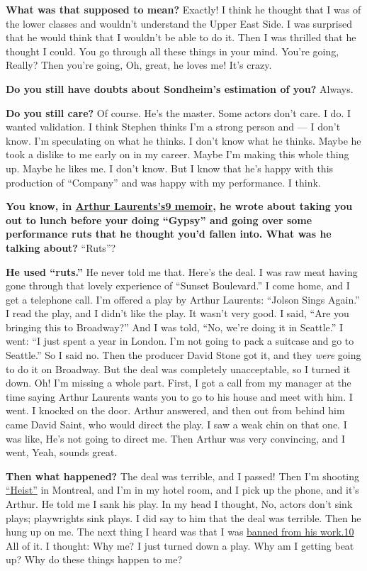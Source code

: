 \textbf{What was that supposed to mean?} Exactly! I think he thought
that I was of the lower classes and wouldn't understand the Upper East
Side. I was surprised that he would think that I wouldn't be able to do
it. Then I was thrilled that he thought I could. You go through all
these things in your mind. You're going, Really? Then you're going, Oh,
great, he loves me! It's crazy.

\textbf{Do you still have doubts about Sondheim's estimation of you?}
Always.

\textbf{Do you still care?} Of course. He's the master. Some actors
don't care. I do. I wanted validation. I think Stephen thinks I'm a
strong person and --- I don't know. I'm speculating on what he thinks. I
don't know what he thinks. Maybe he took a dislike to me early on in my
career. Maybe I'm making this whole thing up. Maybe he likes me. I don't
know. But I know that he's happy with this production of ``Company'' and
was happy with my performance. I think.

\textbf{You know, in
\href{http://nytimes3xbfgragh.onion\#tooltip-9}{Arthur Laurents's9
memoir}, he wrote about taking you out to lunch before your doing
``Gypsy'' and going over some performance ruts that he thought you'd
fallen into. What was he talking about?} ``Ruts''?

\textbf{He used ``ruts.''} He never told me that. Here's the deal. I was
raw meat having gone through that lovely experience of ``Sunset
Boulevard.'' I come home, and I get a telephone call. I'm offered a play
by Arthur Laurents: ``Jolson Sings Again.'' I read the play, and I
didn't like the play. It wasn't very good. I said, ``Are you bringing
this to Broadway?'' And I was told, ``No, we're doing it in Seattle.'' I
went: ``I just spent a year in London. I'm not going to pack a suitcase
and go to Seattle.'' So I said no. Then the producer David Stone got it,
and they \emph{were} going to do it on Broadway. But the deal was
completely unacceptable, so I turned it down. Oh! I'm missing a whole
part. First, I got a call from my manager at the time saying Arthur
Laurents wants you to go to his house and meet with him. I went. I
knocked on the door. Arthur answered, and then out from behind him came
David Saint, who would direct the play. I saw a weak chin on that one. I
was like, He's not going to direct me. Then Arthur was very convincing,
and I went, Yeah, sounds great.

\textbf{Then what happened?} The deal was terrible, and I passed! Then
I'm shooting
\href{https://www.nytimes3xbfgragh.onion/2001/11/09/movies/film-review-forget-the-girl-and-gold-look-for-the-chemistry.html}{``Heist''}
in Montreal, and I'm in my hotel room, and I pick up the phone, and it's
Arthur. He told me I sank his play. In my head I thought, No, actors
don't sink plays; playwrights sink plays. I did say to him that the deal
was terrible. Then he hung up on me. The next thing I heard was that I
was \href{http://nytimes3xbfgragh.onion\#tooltip-10}{banned from his
work.10} All of it. I thought: Why me? I just turned down a play. Why am
I getting beat up? Why do these things happen to me?

